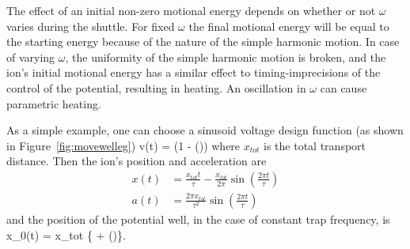 The effect of an initial non-zero motional energy depends on whether or not $\omega$ varies during the shuttle. For fixed $\omega$ the final motional energy will be equal to the starting energy because of the nature of the simple harmonic motion. In case of varying $\omega$, the uniformity of the simple harmonic motion is broken, and the ion's initial motional energy has a similar effect to timing-imprecisions of the control of the potential, resulting in heating. An oscillation in $\omega$ can cause parametric heating.

As a simple example, one can choose a sinusoid voltage design function (as shown in Figure~\ref{fig:movewelleg})
\be
v(t) = \left(1 - \cos\left(\right)\right)
\ee
where $x_{tot}$ is the total transport distance. Then the ion's position and acceleration are
\begin{align}
x(t) & = \frac{x_{tot}t}{\tau} - \frac{x_{tot}}{2\pi}\sin\left(\frac{2\pi t}{\tau}\right) \\
a(t) & = \frac{2 \pi x_{tot} }{\tau^2}\sin\left(\frac{2\pi t}{\tau}\right) 
\end{align}
and the position of the potential well, in the case of constant trap frequency, is 
\be
x_0(t) = x_{tot} \left\{ + \sin\left(\right)\right\}.
\ee



